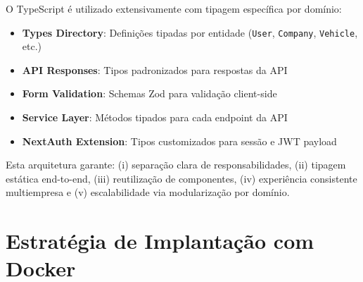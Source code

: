 O TypeScript é utilizado extensivamente com tipagem específica por domínio:

\begin{itemize}
  \item \textbf{Types Directory}: Definições tipadas por entidade (\texttt{User}, \texttt{Company}, \texttt{Vehicle}, etc.)
  \item \textbf{API Responses}: Tipos padronizados para respostas da API
  \item \textbf{Form Validation}: Schemas Zod para validação client-side
  \item \textbf{Service Layer}: Métodos tipados para cada endpoint da API
  \item \textbf{NextAuth Extension}: Tipos customizados para sessão e JWT payload
\end{itemize}

Esta arquitetura garante: (i) separação clara de responsabilidades, (ii) tipagem estática end-to-end, (iii) reutilização de componentes, (iv) experiência consistente multiempresa e (v) escalabilidade via modularização por domínio.

\section{Estratégia de Implantação com Docker}